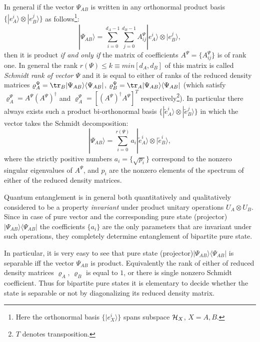 \documentclass[rmp,12pt,preprint]{revtex4-2}
\begin{document}
In general if the vector $\Psi_{AB}$ is written in any orthonormal
product basis $\{ |e_{A}^{i} \rangle \otimes |e_{B}^{j} \rangle \}$ as
follows\footnote{Here the orthonormal basis $\{ |e_{X}^{i} \rangle\}$
  spans subspace ${\cal H}_{X}$, $X=A,B$.}:
\begin{equation} |\Psi_{AB}\rangle =\sum_{i=0}^{d_{A}-1}\sum_{j=0}^{d_{B}-1}
A^{\Psi}_{ij} |e_{A}^{i} \rangle \otimes |e_{B}^{j} \rangle,
\end{equation}
then it is product {\it if and only if} the matrix of coefficients
$A^{\Psi}=\{ A^{\Psi}_{ij} \}$ is of rank one. In general the rank
$r(\Psi)\leq k\equiv min[d_{A},d_{B}]$ of this matrix is called {\it
  Schmidt rank of vector $\Psi$ } and it is equal to either of ranks
of the reduced density matrices
$\varrho_{A}^{\Psi}={\tr}_{B}|\Psi_{AB}\rangle \langle \Psi_{AB}|$,
$\varrho_{B}^{\Psi}={\tr}_{A}|\Psi_{AB}\rangle \langle \Psi_{AB}|$
(which satisfy $\varrho_{A}^{\Psi}=A^{\Psi}(A^{\Psi})^{\dagger}$ and
$\varrho_{A}^{\Psi}=[(A^{\Psi})^{\dagger}A^{\Psi}]^T$
respectively\footnote{$T$ denotes transposition.}). In particular
there always exists such a product bi-orthonormal basis $\{
|\tilde{e}_{A}^{i} \rangle \otimes |\tilde{e}_{B}^{j} \rangle \}$ in
which the vector takes the Schmidt decomposition:
\begin{equation}
|\Psi_{AB}\rangle =\sum_{i=0}^{r(\Psi)} a_{i} |\tilde{e}_{A}^{i}
\rangle \otimes |\tilde{e}_{B}^{i} \rangle,
\end{equation}
where the strictly positive numbers $a_{i}=\{ \sqrt{p_{i}} \}$
correspond to the nonzero singular eigenvalues \cite{Nielsen-Chuang}
of $A^{\Psi}$, and $ p_{i}$ are the nonzero elements of the spectrum
of either of the reduced density matrices.

Quantum entanglement is in general both quantitatively and
qualitatively considered to be a property {\it invariant} under
product unitary operations $U_{A} \otimes U_{B}$. Since in case of
pure vector and the corresponding pure state (projector)
$|\Psi_{AB}\rangle \langle \Psi_{AB}|$ the coefficients $\{a_{i}\}$
are the only parameters that are invariant under such operations, they
completely determine entanglement of bipartite pure state.

In particular, it is very easy to see that pure state
(projector)$|\Psi_{AB} \rangle \langle \Psi_{AB}|$ is separable iff
the vector $\Psi_{AB}$ is product. Equivalently the  rank of either
of reduced density matrices $\varrho_{A}$, $\varrho_{B}$ is
equal to $1$, or there is single nonzero Schmidt coefficient. Thus
for bipartite pure states it is elementary to decide whether the
state is separable or not by diagonalizing its reduced density
matrix.
\end{document}
